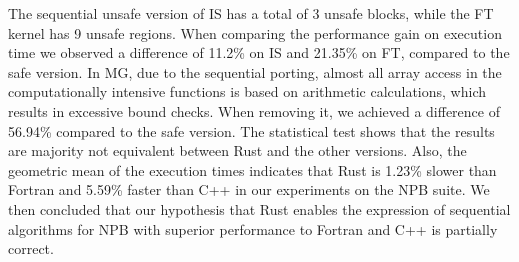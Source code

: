 
    The sequential unsafe version of IS has a total of 3 unsafe blocks, while the FT kernel has 9 unsafe regions. When comparing the performance gain on execution time we observed a difference of 11.2\% on IS and 21.35\% on FT, compared to the safe version. In MG, due to the sequential porting, almost all array access in the computationally intensive functions is based on arithmetic calculations, which results in excessive bound checks. When removing it, we achieved a difference of 56.94\% compared to the safe version.
    The statistical test shows that the results are majority not equivalent between Rust and the other versions. Also, the geometric mean of the execution times indicates that Rust is 1.23\% slower than Fortran and 5.59\% faster than C++ in our experiments on the NPB suite. We then concluded that our hypothesis that Rust enables the expression of sequential algorithms for NPB with superior performance to Fortran and C++ is partially correct.



    


